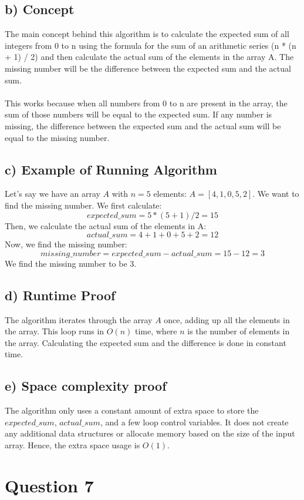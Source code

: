 \documentclass[12pt, letterpaper]{article}
\begin{document}
\subsection{b) Concept}
The main concept behind this algorithm is to calculate the expected sum of all integers from 0 to n using the formula for the sum of an arithmetic series (n * (n + 1) / 2) and then calculate the actual sum of the elements in the array A. The missing number will be the difference between the expected sum and the actual sum.\\\\
This works because when all numbers from 0 to n are present in the array, the sum of those numbers will be equal to the expected sum. If any number is missing, the difference between the expected sum and the actual sum will be equal to the missing number.

\subsection{c) Example of Running Algorithm}
Let's say we have an array $A$ with $n = 5$ elements: $ A = [4, 1, 0, 5, 2]$. We want to find the missing number. We first calculate:
$$expected\_sum = 5 * (5 + 1) / 2 = 15$$
Then, we calculate the actual sum of the elements in A:
$$actual\_sum = 4 + 1 + 0 + 5 + 2 = 12$$
Now, we find the missing number:
$$missing\_number = expected\_sum - actual\_sum = 15 - 12 = 3
$$
We find the missing number to be 3.

\subsection{d) Runtime Proof}
The algorithm iterates through the array $A$ once, adding up all the elements in the array. This loop runs in $O(n)$ time, where $n$ is the number of elements in the array. Calculating the expected sum and the difference is done in constant time.

\subsection{e) Space complexity proof}
The algorithm only uses a constant amount of extra space to store the $expected\_sum$, $actual\_sum$, and a few loop control variables. It does not create any additional data structures or allocate memory based on the size of the input array. Hence, the extra space usage is $O(1)$.

\newpage

\section{Question 7}
\end{document}
